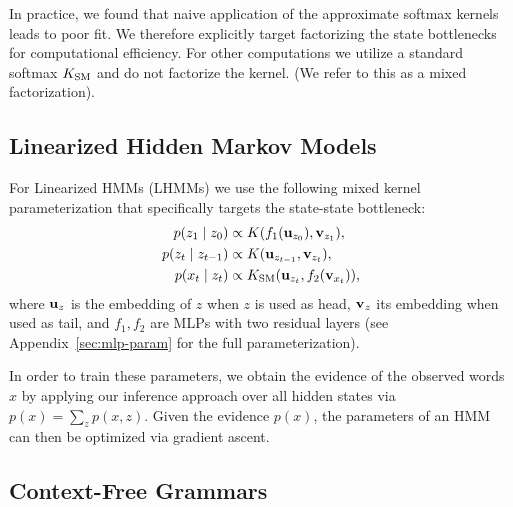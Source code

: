 \documentclass{article}
\begin{document}
In practice, we found that naive application of the approximate softmax kernels leads to poor fit. We therefore explicitly target factorizing the state bottlenecks for computational efficiency.
For other computations we utilize a standard softmax $K_{\mathrm{SM}}$ and do not factorize the kernel. (We refer to this as a mixed factorization).

\subsection*{Linearized Hidden Markov Models}

 For Linearized HMMs (LHMMs) we  use the following mixed kernel parameterization that specifically targets the state-state bottleneck:
\begin{equation}
\begin{aligned}
p(z_1 \mid z_0) &\propto K(f_1(\mathbf{u}_{z_0}), \mathbf{v}_{z_1}),\\
p(z_t \mid z_{t-1}) &\propto K(\mathbf{u}_{z_{t-1}}, \mathbf{v}_{z_t}),\\
p(x_t \mid z_t) &\propto K_{\mathrm{SM}}(\mathbf{u}_{z_t}, f_2(\mathbf{v}_{x_t})),
\end{aligned}
\end{equation}
where $\mathbf{u}_{z}$ is the embedding of $z$ when $z$ is used as head, $\mathbf{v}_{z}$ its embedding when used as tail, and $f_1, f_2$ are MLPs with two residual layers (see Appendix~\ref{sec:mlp-param} for the full parameterization).

In order to train these parameters, we obtain the evidence of the observed words $x$ by applying our inference approach over all hidden states via $p(x) = \sum_z p(x,z)$.
Given the evidence $p(x)$, the parameters of an HMM can then be optimized via gradient ascent.





\subsection*{Context-Free Grammars}
\end{document}
